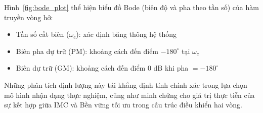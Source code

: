 \documentclass[../main.tex]{subfiles}
\begin{document}
Hình~\ref{fig:bode_plot} thể hiện biểu đồ Bode (biên độ và pha theo tần số) của hàm truyền vòng hở:
\begin{itemize}
    \item Tần số cắt biên ($\omega_c$): xác định băng thông hệ thống
    \item Biên pha dự trữ (PM): khoảng cách đến điểm $-180^\circ$ tại $\omega_c$
    \item Biên dự trữ (GM): khoảng cách đến điểm $0$ dB khi pha $= -180^\circ$
\end{itemize}

Những phân tích định lượng này tái khẳng định tính chính xác trong lựa chọn mô hình nhận dạng thực nghiệm, cũng như minh chứng cho giá trị thực tiễn của sự kết hợp giữa IMC và Bền vững tối ưu trong cấu trúc điều khiển hai vòng.
\end{document}
